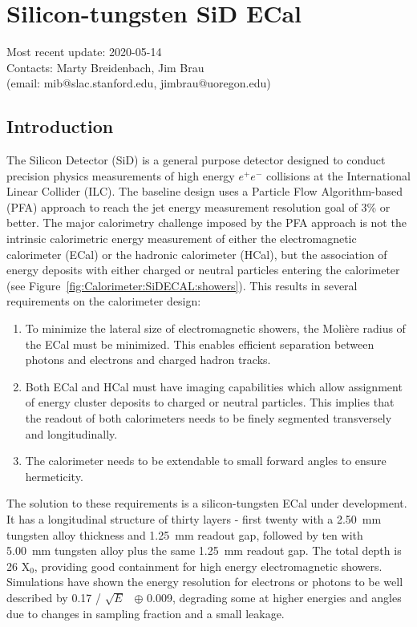 \section{Silicon-tungsten SiD ECal}
\label{sec:Calorimeter:SiliconTungstenSiD}
Most recent update: 2020-05-14 \\
Contacts: Marty Breidenbach, Jim Brau\\ (email: mib@slac.stanford.edu, jimbrau@uoregon.edu)

\subsection{Introduction}
The Silicon Detector (SiD) is a general purpose detector\cite{Behnke:2013lya} designed to conduct precision physics measurements of high energy $e^+e^-$ collisions at the International Linear Collider (ILC). The baseline design uses a Particle Flow Algorithm-based (PFA) approach to reach the jet energy measurement resolution goal of 3\% or better. The major calorimetry challenge imposed by the PFA approach is not the intrinsic calorimetric energy measurement of either the electromagnetic calorimeter (ECal) or the hadronic calorimeter (HCal), but the association of energy deposits with either charged or neutral particles entering the calorimeter (see Figure~\ref{fig:Calorimeter:SiDECAL:showers}). This results in several requirements on the calorimeter design:
\begin{enumerate}[label=\alph*)]
\item To minimize the lateral size of electromagnetic showers, the  Moli\`{e}re  radius  of  the  ECal must be minimized. This enables efficient separation between photons and electrons and charged hadron tracks.
\item Both ECal and HCal must have imaging capabilities which allow assignment of energy cluster deposits to charged or neutral particles. This implies that the readout of both calorimeters needs to be finely segmented transversely and longitudinally.
\item The calorimeter needs to be extendable to small forward angles to ensure hermeticity.
\end{enumerate}

The solution to these requirements is a silicon-tungsten ECal under development. It has a
longitudinal structure of thirty layers - first twenty with a \SI{2.50}{mm} tungsten alloy thickness and \SI{1.25}{mm} readout gap, followed by ten with \SI{5.00}{mm} tungsten alloy plus the same \SI{1.25}{mm} readout gap. The total depth is 26 X$_0$, providing good containment for high energy electromagnetic showers. Simulations have shown the energy resolution for electrons or photons to be well described by 0.17 / $\sqrt{E}$~ $\oplus$ 0.009, degrading some at higher energies
and angles due to changes in sampling
fraction and a small leakage.


